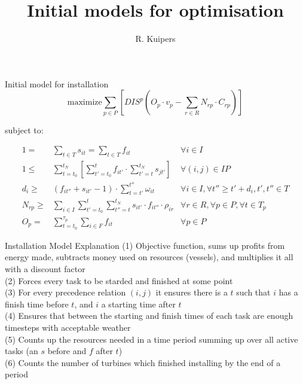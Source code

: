 \documentclass{beamer}
\title[Initial models for optimisation]{Initial models for optimisation}
\author{R. Kuipers}
\begin{document}
\begin{frame}
  \titlepage
\end{frame}

\begin{frame}{Initial model for installation}
\footnotesize
\begin{equation}
	\text{maximize} \sum_{p \in P} [ DIS^p (O_p \cdot v_p - \sum_{r \in R} N_{rp} \cdot C_{rp}) ]
\end{equation}

\bigskip
subject to:

\begin{align}
1 =& \sum_{t \in T} s_{it}	= \sum_{t \in T} f_{it}										&	\forall i \in I 						\\
1 \leq& \sum_{t = t_0}^{t_N} [ \sum_{t' = t_0}^t f_{it'} \cdot \sum_{t' = t}^{t_N} s_{jt'} ]	&	\forall (i, j) \in IP					\\
d_i \geq& (f_{it''} + s_{it'} - 1) \cdot \sum_{t = t'}^{t''} \omega_{it} 							& 	\forall i \in I, 	\forall t'' \geq t' + d_i, t', t'' \in T	\\
N_{rp} \geq& \sum_{i\in I} \sum_{t' = t_0}^t \sum_{t'' = t}^{t_N} s_{it'} \cdot f_{it''} \cdot \rho_{ir}	& 	\forall r \in R, \forall p \in P, \forall t \in T_p 	\\
O_p =&  \sum_{t = t_0}^{\tau_p} \sum_{i \in F} f_{it}									&	\forall p \in P
\end{align}

\end{frame}

\begin{frame}{Installation Model Explanation}
(1) Objective function, sums up profits from energy made, subtracts money used on resources (vessels), and multiplies it all with a discount factor	\\
(2) Forces every task to be starded and finished at some point	\\
(3) For every precedence relation $(i, j)$ it ensures there is a $t$ such that $i$ has a finish time before $t$, and $i$ a starting time after $t$	\\
(4) Ensures that between the starting and finish times of each task are enough timesteps with acceptable weather	\\
(5) Counts up the resources needed in a time period summing up over all active tasks (an $s$ before and $f$ after $t$)	\\
(6) Counts the number of turbines which finished installing by the end of a period	
\end{frame}
\end{document}
